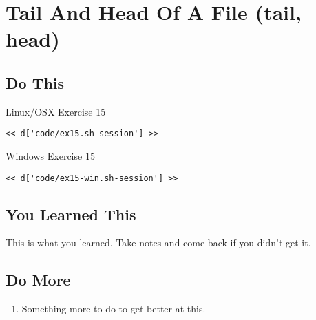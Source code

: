 \chapter{Tail And Head Of A File (tail, head)}

\section{Do This}

\begin{code}{Linux/OSX Exercise 15}
\begin{Verbatim}
<< d['code/ex15.sh-session'] >>
\end{Verbatim}
\end{code}

\begin{code}{Windows Exercise 15}
\begin{Verbatim}
<< d['code/ex15-win.sh-session'] >>
\end{Verbatim}
\end{code}

\section{You Learned This}

This is what you learned.  Take notes and come back if you didn't get it.

\section{Do More}

\begin{enumerate}
\item Something more to do to get better at this.
\end{enumerate}

